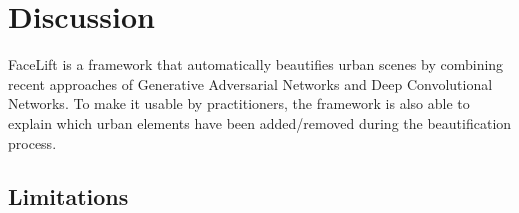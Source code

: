 
\section{Discussion}
FaceLift is a  framework that automatically beautifies urban scenes by combining recent approaches of Generative Adversarial Networks and Deep Convolutional Networks. To make it usable by practitioners, the framework is also able to explain which urban elements have been added/removed during the beautification process. 

\subsection{Limitations}

